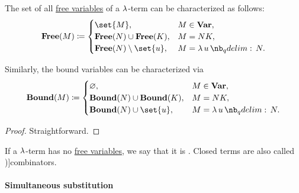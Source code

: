 \begin{proposition}\label{thm:lambda_variable_freeness_characterization}
  The set of all \hyperref[def:lambda_variable_freeness]{free variables} of a \( \mathrm{\lambda} \)-term can be characterized as follows:
  \begin{equation*}
    \op*{Free}(M) \coloneqq \begin{cases}
      \set{ M },                         &M \in \op*{Var}, \\
      \op*{Free}(N) \cup \op*{Free}(K),  &M = N K, \\
      \op*{Free}(N) \setminus \set{ u }, &M = \qabs u N. \\
    \end{cases}
  \end{equation*}

  Similarly, the bound variables can be characterized via
  \begin{equation*}
    \op*{Bound}(M) \coloneqq \begin{cases}
      \varnothing,                        &M \in \op*{Var}, \\
      \op*{Bound}(N) \cup \op*{Bound}(K), &M = N K, \\
      \op*{Bound}(N) \cup \set{ u },      &M = \qabs u N. \\
    \end{cases}
  \end{equation*}
\end{proposition}
\begin{proof}
  Straightforward.
\end{proof}

\begin{definition}\label{def:lambda_combinator}
  If a \( \mathrm{\lambda} \)-term has no \hyperref[def:lambda_variable_freeness]{free variables}, we say that it is . Closed terms are also called \term[ru=комбинаторы (\cite[188]{Герасимов2011})]{combinators}.
\end{definition}

\paragraph{Simultaneous substitution}

